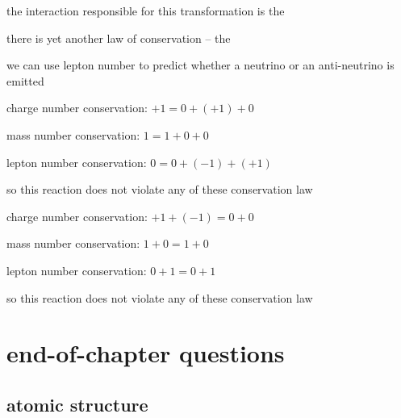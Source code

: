 the interaction responsible for this transformation is the 

\cmt there is yet another law of conservation -- the 

we can use lepton number to predict whether a neutrino or an anti-neutrino is emitted


\begin{soln} charge number conservation: $+1 = 0 + (+1) + 0$ \xskip {}

mass number conservation: $1 = 1 + 0 + 0$ \xskip {}

lepton number conservation: $0 = 0 + (-1) + (+1)$ \xskip {}

so this reaction does not violate any of these conservation law \end{soln}



\begin{soln} charge number conservation: $+1 + (-1) = 0 + 0$  \xskip {}

mass number conservation: $1 + 0 = 1 + 0$ \xskip {}

lepton number conservation: $0 + 1 = 0 + 1$  \xskip {}

so this reaction does not violate any of these conservation law \end{soln}

	
\section{end-of-chapter questions}

\subsection*{atomic structure}

